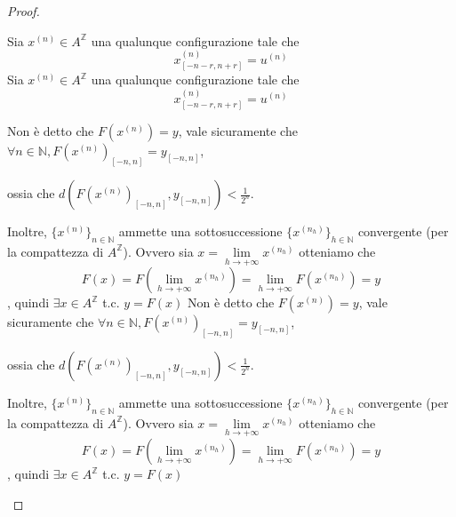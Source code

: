 \begin{teorema}
\begin{proof}
\begin{itemize}
                  Sia $x^{(n)}\in A^\mathbb{Z}$ una qualunque configurazione tale che
                  $$x^{(n)}_{[-n-r,n+r]} = u^{(n)}$$
                  Sia $x^{(n)}\in A^\mathbb{Z}$ una qualunque configurazione tale che
                  $$x^{(n)}_{[-n-r,n+r]} = u^{(n)}$$

                  Non è detto che $F(x^{(n)})=y$, vale sicuramente che $\forall n \in \mathbb{N},F(x^{(n)})_{[-n,n]}=y_{[-n,n]}$,
                  
                  ossia che $d(F(x^{(n)})_{[-n,n]},y_{[-n,n]})< \frac{1}{2^n}$.

                  Inoltre, $\{x^{(n)}\}_{n\in \mathbb{N}}$ ammette una sottosuccessione
                  $\{x^{(n_h)}\}_{h\in \mathbb{N}}$ convergente (per la compattezza di $A^{\mathbb{Z}}$).
                  Ovvero sia $x= \lim\limits_{h\rightarrow +\infty}x ^{(n_h)}$ otteniamo  che $$ F(x)= F(\lim\limits_{h\rightarrow +\infty}x ^{(n_h)}) = \lim\limits_{h\rightarrow +\infty} F(x^{(n_h)})=y$$,
                  quindi $\exists x \in A^\mathbb{Z}$ t.c. $y = F(x)$
                  Non è detto che $F(x^{(n)})=y$, vale sicuramente che $\forall n \in \mathbb{N},F(x^{(n)})_{[-n,n]}=y_{[-n,n]}$,
                  
                  ossia che $d(F(x^{(n)})_{[-n,n]},y_{[-n,n]})< \frac{1}{2^n}$.

                  Inoltre, $\{x^{(n)}\}_{n\in \mathbb{N}}$ ammette una sottosuccessione
                  $\{x^{(n_h)}\}_{h\in \mathbb{N}}$ convergente (per la compattezza di $A^{\mathbb{Z}}$).
                  Ovvero sia $x= \lim\limits_{h\rightarrow +\infty}x ^{(n_h)}$ otteniamo  che $$ F(x)= F(\lim\limits_{h\rightarrow +\infty}x ^{(n_h)}) = \lim\limits_{h\rightarrow +\infty} F(x^{(n_h)})=y$$,
                  quindi $\exists x \in A^\mathbb{Z}$ t.c. $y = F(x)$
        \end{itemize}
    \end{proof}
\end{teorema}


